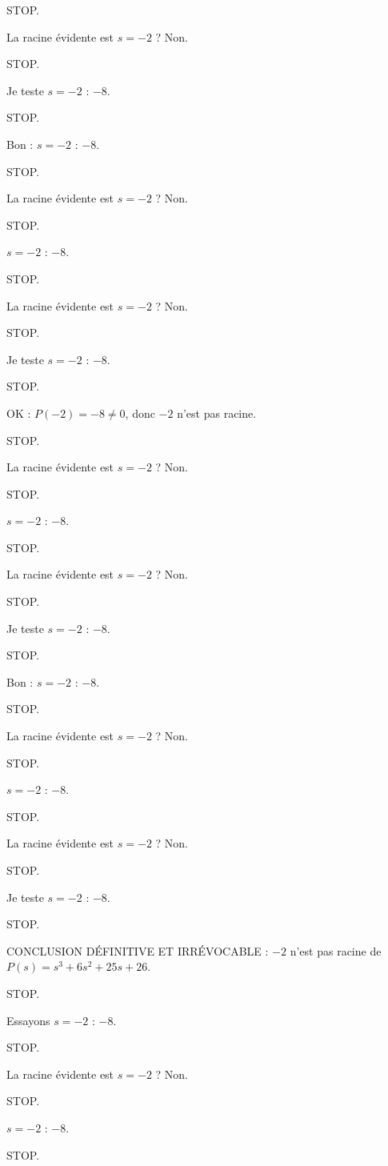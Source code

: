 \documentclass[11pt]{article}
\begin{document}
\begin{exoresolu}
\begin{enumerate}
STOP. 

La racine évidente est $s = -2$ ? Non. 

STOP. 

Je teste $s = -2$ : $-8$. 

STOP. 

Bon : $s = -2$ : $-8$. 

STOP. 

La racine évidente est $s = -2$ ? Non. 

STOP. 

$s = -2$ : $-8$. 

STOP. 

La racine évidente est $s = -2$ ? Non. 

STOP. 

Je teste $s = -2$ : $-8$. 

STOP. 

OK : $P(-2) = -8 \neq 0$, donc $-2$ n'est pas racine. 

STOP. 

La racine évidente est $s = -2$ ? Non. 

STOP. 

$s = -2$ : $-8$. 

STOP. 

La racine évidente est $s = -2$ ? Non. 

STOP. 

Je teste $s = -2$ : $-8$. 

STOP. 

Bon : $s = -2$ : $-8$. 

STOP. 

La racine évidente est $s = -2$ ? Non. 

STOP. 

$s = -2$ : $-8$. 

STOP. 

La racine évidente est $s = -2$ ? Non. 

STOP. 

Je teste $s = -2$ : $-8$. 

STOP. 

CONCLUSION DÉFINITIVE ET IRRÉVOCABLE : $-2$ n'est pas racine de $P(s) = s^3 + 6s^2 + 25s + 26$. 

STOP. 

Essayons $s = -2$ : $-8$. 

STOP. 

La racine évidente est $s = -2$ ? Non. 

STOP. 

$s = -2$ : $-8$. 

STOP. 


\end{enumerate}
\end{exoresolu}
\end{document}
